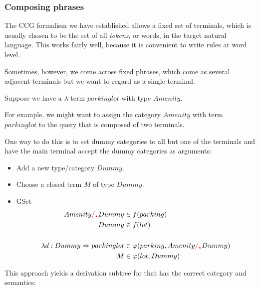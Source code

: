 \documentclass[main.tex]{subfiles}
\begin{document}
\subsubsection{Composing phrases}
The CCG formalism we have established allows a fixed set of terminals,
which is usually chosen to be the set of all \emph{tokens}, or words,
in the target natural language. This works fairly well, because it is
convenient to write rules at word level.

Sometimes, however, we come across fixed phrases, which come as several
adjacent terminals but we want to regard as a single terminal.

\begin{example}
    Suppose we have a $\lambda$-term $parkinglot$ with type $Amenity$.
    
    For example, we might want to assign the category $Amenity$ with term
    $parkinglot$
    to the query  that is composed of two terminals.
    
    One way to do this is to set dummy categories to all but one of the
    terminals and have the main terminal accept the dummy categories as
    arguments:
   
    \begin{itemize}
        \item Add a new type/category $Dummy$.
        \item Choose a closed term $M$ of type $Dummy$.
        \item GSet
            \begin{align*}
                Amenity \textcolor{red}{/_{\star}} Dummy &\in f(parking)\\
                Dummy &\in f(lot) \\
                \\
                \lambda d: Dummy \Rightarrow parkinglot &\in \varphi(parking, Amenity \textcolor{red}{/_{\star}} Dummy)  \\
                M &\in \varphi(lot, Dummy) \\
            \end{align*}
    \end{itemize}
    
    This approach yields a derivation subtree for  that
    has the correct category and semantics:
\end{example}
\end{document}
